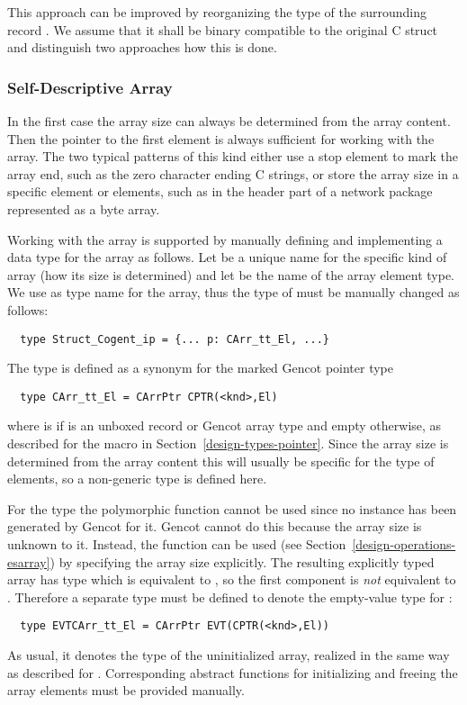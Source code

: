 This approach can be improved by reorganizing the type of the surrounding record . We
assume that it shall be binary compatible to the original C struct  and distinguish two approaches how 
this is done.

\subsubsection{Self-Descriptive Array}

In the first case the array size can always be determined from the array content. Then the pointer to the first 
element is always sufficient for working with the array. The two typical patterns of this kind either use a 
stop element to mark the array end, such as the zero character ending C strings, or store the array size in a
specific element or elements, such as in the header part of a network package represented as a byte array.

Working with the array is supported by manually defining and implementing a data type for the array as follows.
Let  be a unique name for the specific kind of array (how its size is determined) and let  be the
name of the array element type. We use  as type name for the array, thus the 
type of  must be manually changed as follows:
\begin{verbatim}
  type Struct_Cogent_ip = {... p: CArr_tt_El, ...}
\end{verbatim}

The type  is defined as a synonym for the marked Gencot pointer type
\begin{verbatim}
  type CArr_tt_El = CArrPtr CPTR(<knd>,El)
\end{verbatim}
where  is  if  is an unboxed record or Gencot array type and empty otherwise, as described
for the macro  in Section~\ref{design-types-pointer}.
Since the array size is determined from the array content this will usually be specific for the type of elements,
so a non-generic type is defined here.

For the type  the polymorphic function  cannot be used since no instance has been
generated by Gencot for it. Gencot cannot do this because the array size is unknown to it. Instead, the function
 can be used (see Section~\ref{design-operations-esarray}) by specifying the array size explicitly. 
The resulting explicitly typed array has type  which is equivalent to ,
so the first component is \textit{not} equivalent to . Therefore a separate type must be defined
to denote the empty-value type for :
\begin{verbatim}
  type EVTCArr_tt_El = CArrPtr EVT(CPTR(<knd>,El))
\end{verbatim}
As usual, it denotes the type of the uninitialized array, realized in the same way as described for . 
Corresponding abstract functions for initializing and freeing the array elements must be provided manually.

